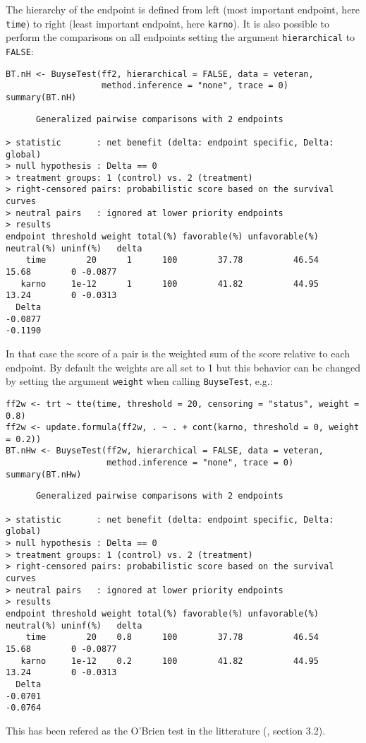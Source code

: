 \documentclass[12pt]{article}
\begin{document}
The hierarchy of the endpoint is defined from left (most important
endpoint, here \texttt{time}) to right (least important endpoint, here
\texttt{karno}). It is also possible to perform the comparisons on all
endpoints setting the argument \texttt{hierarchical} to \texttt{FALSE}:
\lstset{language=r,label= ,caption= ,captionpos=b,numbers=none}
\begin{lstlisting}
BT.nH <- BuyseTest(ff2, hierarchical = FALSE, data = veteran, 
				   method.inference = "none", trace = 0)
summary(BT.nH)
\end{lstlisting}

\begin{verbatim}
      Generalized pairwise comparisons with 2 endpoints

> statistic       : net benefit (delta: endpoint specific, Delta: global) 
> null hypothesis : Delta == 0 
> treatment groups: 1 (control) vs. 2 (treatment) 
> right-censored pairs: probabilistic score based on the survival curves
> neutral pairs   : ignored at lower priority endpoints
> results
endpoint threshold weight total(%) favorable(%) unfavorable(%) neutral(%) uninf(%)   delta
    time        20      1      100        37.78          46.54      15.68        0 -0.0877
   karno     1e-12      1      100        41.82          44.95      13.24        0 -0.0313
  Delta
-0.0877
-0.1190
\end{verbatim}

In that case the score of a pair is the weighted sum of the score
relative to each endpoint. By default the weights are all set to 1 but
this behavior can be changed by setting the argument \texttt{weight} when
calling \texttt{BuyseTest}, e.g.:
\lstset{language=r,label= ,caption= ,captionpos=b,numbers=none}
\begin{lstlisting}
ff2w <- trt ~ tte(time, threshold = 20, censoring = "status", weight = 0.8)
ff2w <- update.formula(ff2w, . ~ . + cont(karno, threshold = 0, weight = 0.2))
BT.nHw <- BuyseTest(ff2w, hierarchical = FALSE, data = veteran, 
					method.inference = "none", trace = 0)
summary(BT.nHw)
\end{lstlisting}

\begin{verbatim}
      Generalized pairwise comparisons with 2 endpoints

> statistic       : net benefit (delta: endpoint specific, Delta: global) 
> null hypothesis : Delta == 0 
> treatment groups: 1 (control) vs. 2 (treatment) 
> right-censored pairs: probabilistic score based on the survival curves
> neutral pairs   : ignored at lower priority endpoints
> results
endpoint threshold weight total(%) favorable(%) unfavorable(%) neutral(%) uninf(%)   delta
    time        20    0.8      100        37.78          46.54      15.68        0 -0.0877
   karno     1e-12    0.2      100        41.82          44.95      13.24        0 -0.0313
  Delta
-0.0701
-0.0764
\end{verbatim}
This has been refered as the O’Brien test in the litterature
(\cite{verbeeck2019generalized}, section 3.2).
\end{document}

